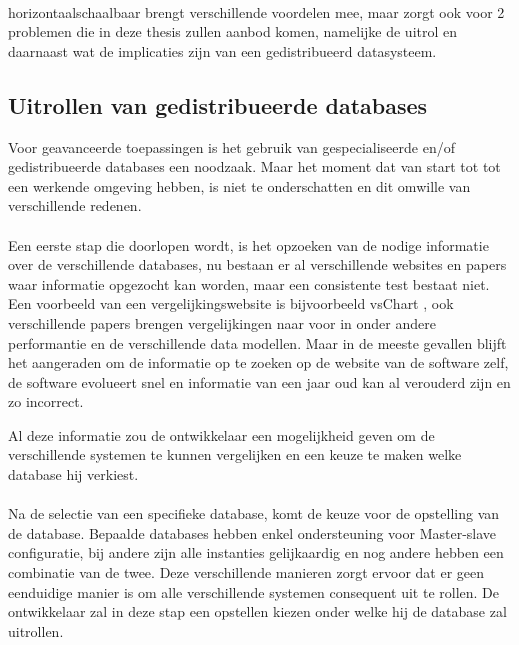 \paragraph{}
\Gls{horizontaalschaalbaar} brengt verschillende voordelen mee, maar zorgt ook voor 2 problemen die in deze thesis zullen aanbod komen, namelijke de uitrol en daarnaast wat de implicaties zijn van een gedistribueerd datasysteem. 

\subsection{Uitrollen van gedistribueerde databases}
Voor geavanceerde toepassingen is het gebruik van gespecialiseerde en/of gedistribueerde databases een noodzaak. Maar het moment dat van start tot tot een werkende omgeving hebben, is niet te onderschatten en dit omwille van verschillende redenen. 

\paragraph{}Een eerste stap die doorlopen wordt, is het opzoeken van de nodige informatie over de verschillende databases, nu bestaan er al verschillende websites en papers waar informatie opgezocht kan worden, maar een consistente test bestaat niet. Een voorbeeld van een vergelijkingswebsite is bijvoorbeeld vsChart \cite{vsChart}, ook verschillende papers brengen vergelijkingen naar voor in onder andere performantie en de verschillende data modellen. Maar in de meeste gevallen blijft het aangeraden om de informatie op te zoeken op de website van de software zelf, de software evolueert snel en informatie van een jaar oud kan al verouderd zijn en zo incorrect. 

Al deze informatie zou de ontwikkelaar een mogelijkheid geven om de verschillende systemen te kunnen vergelijken en een keuze te maken welke database hij verkiest. 

\paragraph{} Na de selectie van een specifieke database, komt de keuze voor de opstelling van de database. Bepaalde databases hebben enkel ondersteuning voor Master-slave configuratie, bij andere zijn alle instanties gelijkaardig en nog andere hebben een combinatie van de twee. Deze verschillende manieren zorgt ervoor dat er geen eenduidige manier is om alle verschillende systemen consequent uit te rollen. De ontwikkelaar zal in deze stap een opstellen kiezen onder welke hij de database zal uitrollen. 

